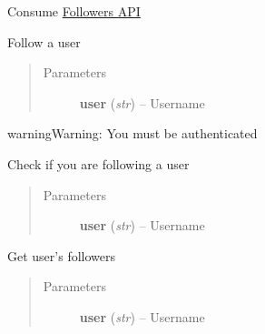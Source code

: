 \documentclass[letterpaper,10pt,english]{sphinxmanual}
\begin{document}
\begin{fulllineitems}
\label{users:pygithub3.services.users.Followers}
Consume \href{http://developer.github.com/v3/users/followers/}{Followers API}

\begin{fulllineitems}
\label{users:pygithub3.services.users.Followers.follow}
Follow a user
\begin{quote}\begin{description}
\item[{Parameters}] \leavevmode
\textbf{user} (\emph{str}) -- Username

\end{description}\end{quote}

\begin{notice}{warning}{Warning:}
You must be authenticated
\end{notice}

\end{fulllineitems}


\begin{fulllineitems}
\label{users:pygithub3.services.users.Followers.is_following}
Check if you are following a user
\begin{quote}\begin{description}
\item[{Parameters}] \leavevmode
\textbf{user} (\emph{str}) -- Username

\end{description}\end{quote}

\end{fulllineitems}


\begin{fulllineitems}
\label{users:pygithub3.services.users.Followers.list}
Get user's followers
\begin{quote}\begin{description}
\item[{Parameters}] \leavevmode
\textbf{user} (\emph{str}) -- Username


\end{description}
\end{quote}
\end{fulllineitems}
\end{fulllineitems}
\end{document}
